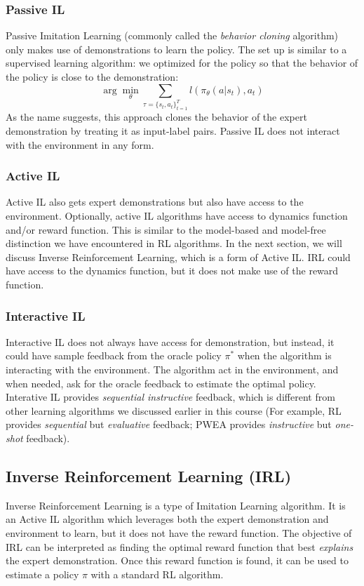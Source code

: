 \documentclass[11pt]{article}
\begin{document}
\subsubsection{Passive IL}
Passive Imitation Learning (commonly called the \textit{behavior cloning} algorithm) only makes use of demonstrations to learn the policy. The set up is similar to a supervised learning algorithm: we optimized for the policy so that the behavior of the policy is close to the demonstration:
\begin{equation}
    \arg\min_\theta\sum_{\tau=\{s_t,a_t\}_{t=1}^T} l(\pi_\theta(a|s_t), a_t)
\end{equation}
As the name suggests, this approach clones the behavior of the expert demonstration by treating it as input-label pairs. Passive IL does not interact with the environment in any form.

\subsubsection{Active IL}
Active IL also gets expert demonstrations but also have access to the environment. Optionally, active IL algorithms have access to dynamics function and/or reward function. This is similar to the model-based and model-free distinction we have encountered in RL algorithms. In the next section, we will discuss Inverse Reinforcement Learning, which is a form of Active IL. IRL could have access to the dynamics function, but it does not make use of the reward function. 

\subsubsection{Interactive IL}
Interactive IL does not always have access for demonstration, but instead, it could have sample feedback from the oracle policy $\pi^*$ when the algorithm is interacting with the environment. The algorithm act in the environment, and when needed, ask for the oracle feedback to estimate the optimal policy. Interative IL provides \textit{sequential instructive} feedback, which is different from other learning algorithms we discussed earlier in this course (For example, RL provides \textit{sequential} but \textit{evaluative} feedback; PWEA provides \textit{instructive} but \textit{one-shot} feedback).


\subsection{Inverse Reinforcement Learning (IRL)}
Inverse Reinforcement Learning is a type of Imitation Learning algorithm. It is an Active IL algorithm which leverages both the expert demonstration and environment to learn, but it does not have the reward function. The objective of IRL can be interpreted as finding the optimal reward function that best \textit{explains} the expert demonstration. Once this reward function is found, it can be used to estimate a policy $\pi$ with a standard RL algorithm. 
\end{document}
